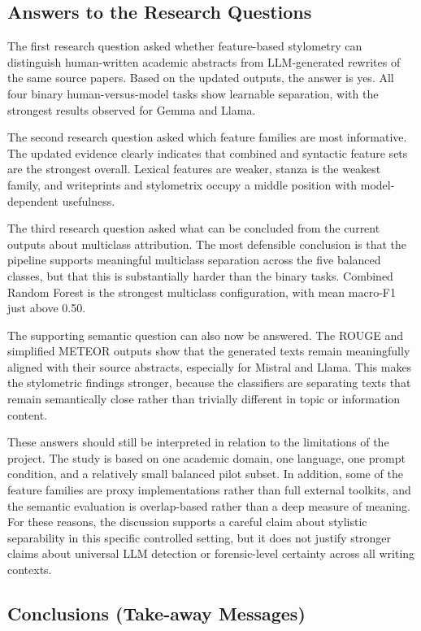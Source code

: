 \documentclass[12pt,a4paper]{article}
\begin{document}
\subsection{Answers to the Research Questions}

The first research question asked whether feature-based stylometry can distinguish human-written academic abstracts from LLM-generated rewrites of the same source papers. Based on the updated outputs, the answer is yes. All four binary human-versus-model tasks show learnable separation, with the strongest results observed for Gemma and Llama.

The second research question asked which feature families are most informative. The updated evidence clearly indicates that combined and syntactic feature sets are the strongest overall. Lexical features are weaker, stanza is the weakest family, and writeprints and stylometrix occupy a middle position with model-dependent usefulness.

The third research question asked what can be concluded from the current outputs about multiclass attribution. The most defensible conclusion is that the pipeline supports meaningful multiclass separation across the five balanced classes, but that this is substantially harder than the binary tasks. Combined Random Forest is the strongest multiclass configuration, with mean macro-F1 just above 0.50.

The supporting semantic question can also now be answered. The ROUGE and simplified METEOR outputs show that the generated texts remain meaningfully aligned with their source abstracts, especially for Mistral and Llama. This makes the stylometric findings stronger, because the classifiers are separating texts that remain semantically close rather than trivially different in topic or information content.

These answers should still be interpreted in relation to the limitations of the project. The study is based on one academic domain, one language, one prompt condition, and a relatively small balanced pilot subset. In addition, some of the feature families are proxy implementations rather than full external toolkits, and the semantic evaluation is overlap-based rather than a deep measure of meaning. For these reasons, the discussion supports a careful claim about stylistic separability in this specific controlled setting, but it does not justify stronger claims about universal LLM detection or forensic-level certainty across all writing contexts.

\subsection{Conclusions (Take-away Messages)}
\end{document}
